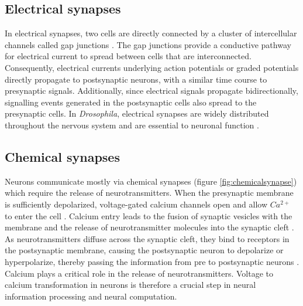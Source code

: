 \subsection{Electrical synapses}
In electrical synapses, two cells are directly connected by a cluster of intercellular channels called gap junctions \parencite{Bennett2004}. The gap junctions provide a conductive pathway for electrical current to spread between cells that are interconnected. Consequently, electrical currents underlying action potentials or graded potentials directly propagate to postsynaptic neurons, with a similar time course to presynaptic signals. Additionally, since electrical signals propagate bidirectionally, signalling events generated in the postsynaptic cells also spread to the presynaptic cells. In \textit{Drosophila}, electrical synapses are widely distributed throughout the nervous system and are essential to neuronal function \parencite{Ammer2022}.



\subsection{Chemical synapses}
Neurons communicate mostly via chemical synapses (figure  \ref{fig:chemicalsynapse}) which require the release of neurotransmitters. When the presynaptic membrane is sufficiently depolarized, voltage-gated calcium channels open and allow $Ca^{2+}$ to enter the cell \parencite{Luo2020}. Calcium entry leads to the fusion of synaptic vesicles with the membrane and the release of neurotransmitter molecules into the synaptic cleft \parencite{Chapman2002}.  As neurotransmitters diffuse across the synaptic cleft, they bind to receptors in the postsynaptic membrane, causing the postsynaptic neuron to depolarize or hyperpolarize, thereby passing the information from pre to postsynaptic neurons \parencite{Maio2008}. Calcium plays a critical role in the release of neurotransmitters. Voltage to calcium transformation in neurons is therefore a crucial step in neural information processing and neural computation. 

